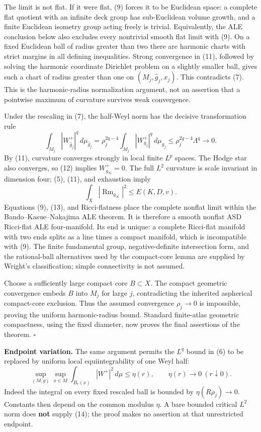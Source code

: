 \documentclass[
  11pt,
]{article}
\begin{document}
The limit is not flat. If it were flat, (9) forces it to be Euclidean
space: a complete flat quotient with an infinite deck group has
sub-Euclidean volume growth, and a finite Euclidean isometry group
acting freely is trivial. Equivalently, the ALE conclusion below also
excludes every nontrivial smooth flat limit with (9). On a fixed
Euclidean ball of radius greater than two there are harmonic charts with
strict margins in all defining inequalities. Strong convergence in (11),
followed by solving the harmonic coordinate Dirichlet problem on a
slightly smaller ball, gives such a chart of radius greater than one on
\((M_j,\widehat g_j,x_j)\). This contradicts (7). This is the
harmonic-radius normalization argument, not an assertion that a
pointwise maximum of curvature survives weak convergence.

Under the rescaling in (7), the half-Weyl norm has the decisive
transformation rule \[
 \int_{M_j}|W^+_{\widehat g_j}|^q\,d\mu_{\widehat g_j}
       =\rho_j^{2q-4}\int_{M_j}|W^+_{g_j}|^q\,d\mu_{g_j}
       \le\rho_j^{2q-4}\Lambda^q\longrightarrow0.        \tag{12}
\] By (11), curvature converges strongly in local finite \(L^p\) spaces.
The Hodge star also converges, so (12) implies \(W^+_{g_\infty}=0\). The
full \(L^2\) curvature is scale invariant in dimension four; (5), (11),
and exhaustion imply \[
                       \int_X|\operatorname{Rm}_{g_\infty}|^2
                              \le E(K,D,v).              \tag{13}
\] Equations (9), (13), and Ricci-flatness place the complete nonflat
limit within the Bando--Kasue--Nakajima ALE theorem. It is therefore a
smooth nonflat ASD Ricci-flat ALE four-manifold. Its end is unique: a
complete Ricci-flat manifold with two ends splits as a line times a
compact manifold, which is incompatible with (9). The finite fundamental
group, negative-definite intersection form, and the rational-ball
alternatives used by the compact-core lemma are supplied by Wright's
classification; simple connectivity is not assumed.

Choose a sufficiently large compact core \(B\subset X\). The compact
geometric convergence embeds \(B\) into \(M_j\) for large \(j\),
contradicting the inherited aspherical compact-core exclusion. Thus the
assumed convergence \(\rho_j\to0\) is impossible, proving the uniform
harmonic-radius bound. Standard finite-atlas geometric compactness,
using the fixed diameter, now proves the final assertions of the
theorem. \(\square\)

\textbf{Endpoint variation.} The same argument permits the \(L^q\) bound
in (6) to be replaced by uniform local equiintegrability of one Weyl
half: \[
 \sup_{(M,g)}\sup_{x\in M}
       \int_{B_r(x)}|W^+|^2\,d\mu\le\eta(r),
              \qquad \eta(r)\longrightarrow0\ (r\downarrow0).
                                                               \tag{14}
\] Indeed the integral on every fixed rescaled ball is bounded by
\(\eta(R\rho_j)\to0\). Constants then depend on the common modulus
\(\eta\). A bare bounded critical \(L^2\) norm does \textbf{not} supply
(14); the proof makes no assertion at that unrestricted endpoint.
\end{document}

